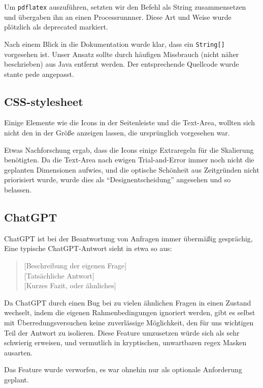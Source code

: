 \documentclass[stu, a4paper, 11pt, floatsintext]{apa7}
\begin{document}
Um \texttt{pdflatex} auszuführen, setzten wir den Befehl als String zusammensetzen und übergaben ihn an einen Processrunnner.
Diese Art und Weise wurde plötzlich als deprecated markiert.

Nach einem Blick in die Dokumentation wurde klar, dass ein \texttt{String[]} vorgesehen ist.
Unser Ansatz sollte durch häufigen Missbrauch (nicht näher beschrieben) aus Java entfernt werden.
Der entsprechende Quellcode wurde stante pede angepasst.

\subsection{CSS-stylesheet}

\noindent Einige Elemente wie die Icons in der Seitenleiste und die Text-Area,
wollten sich nicht den in der Größe anzeigen lassen, die ursprünglich vorgesehen war.

Etwas Nachforschung ergab, dass die Icons einige Extraregeln für die Skalierung benötigten.
Da die Text-Area nach ewigen Trial-and-Error immer noch nicht die geplanten Dimensionen aufwies,
und die optische Schönheit aus Zeitgründen nicht priorisiert wurde, wurde dies als ``Designentscheidung'' angesehen und so belassen.

\subsection{ChatGPT}

\noindent ChatGPT ist bei der Beantwortung von Anfragen immer übermäßig gesprächig,
Eine typische ChatGPT-Antwort sieht in etwa so aus:

\begin{quote}
[Beschreibung der eigenen Frage] \\[0pt]
[Tatsächliche Antwort] \\[0pt]
[Kurzes Fazit, oder ähnliches] \\[0pt]
\end{quote}

\noindent Da ChatGPT durch einen Bug bei zu vielen ähnlichen Fragen in einen Zustand wechselt, indem die eigenen Rahmenbedingungen ignoriert werden, gibt es selbst mit Überredungsversuchen keine zuverlässige Möglichkeit, den für uns wichtigen Teil der Antwort zu isolieren.
Diese Feature umzusetzen würde sich als sehr schwierig erweisen, und vermutlich in kryptischen, unwartbaren regex Masken ausarten.

Das Feature wurde verworfen, es war ohnehin nur als optionale Anforderung geplant.
\end{document}
